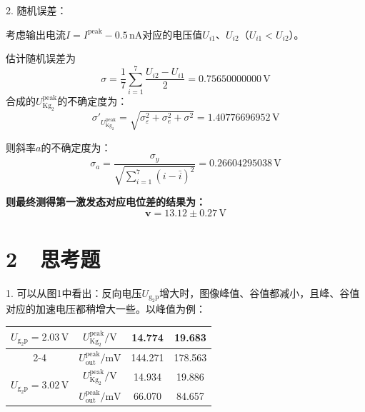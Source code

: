 \documentclass[a4paper,fontset=windows]{ctexart}
\begin{document}
    2. 随机误差：

    考虑输出电流$I = I^{\mathrm{peak}} - 0.5\,\mathrm{nA}$对应的电压值$U_{i1}$、$U_{i2}$（$U_{i1}<U_{i2}$）。

    估计随机误差为
    \[
    \sigma = \frac{1}{7}\sum_{i=1}^{7}\frac{U_{i2}-U_{i1}}{2} = 0.75650000000\,\mathrm{V}
    \]
    合成的$U_{\mathrm{Kg_2}}^{\mathrm{peak}}$的不确定度为：
    \[
    \sigma'_{U_{\mathrm{Kg_2}}^{\mathrm{peak}}} = \sqrt{\sigma_\varepsilon^2 + \sigma_{e}^2 + \sigma^2} = 1.40776696952\,\mathrm{V}
    \]

    则斜率$a$的不确定度为：
    \[
    \sigma_{a} = \frac{\sigma_y}{\sqrt{\sum\limits_{i=1}^{7}\left(i-\bar{i}\right)^2}} = 0.26604295038\,\mathrm{V}
    \]

    \textbf{则最终测得第一激发态对应电位差的结果为：}
    \[
    \boldsymbol{v = 13.12\pm0.27\,\mathrm{V}}
    \]

    \newpage
    \section*{2\ \  思考题}

    1. 可以从图1中看出：反向电压$U_{\mathrm{g_{2}p}}$增大时，图像峰值、谷值都减小，且峰、谷值对应的加速电压都稍增大一些。以峰值为例：

    \begin{table}[ht!]\large
        \begin{center}
            \begin{tabular}{ |c|c|c|c| }
                \hline
                \multirow{2}{*}{$U_{\mathrm{g_{2}p}} = 2.03\,\mathrm{V}$} & $U_{\mathrm{Kg_2}}^{\mathrm{peak}}/\mathrm{V}$ & 14.774 & 19.683 \\
                \cline{2-4}
                 & $U_{\mathrm{out}}^{\mathrm{peak}}/\mathrm{mV}$ & 144.271 & 178.563 \\
                \hline
                \multirow{2}{*}{$U_{\mathrm{g_{2}p}} = 3.02\,\mathrm{V}$} & $U_{\mathrm{Kg_2}}^{\mathrm{peak}}/\mathrm{V}$ & 14.934 & 19.886 \\
                \cline{2-4}
                 & $U_{\mathrm{out}}^{\mathrm{peak}}/\mathrm{mV}$ & 66.070 & 84.657 \\
                \hline
            \end{tabular}
        \end{center}
    \end{table}\vspace{-1.2em}
\end{document}
